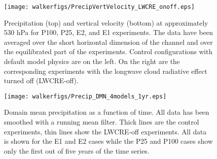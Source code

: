 \documentclass[draft]{agujournal2019}
\begin{document}

\begin{figure}
  \centering
      \texttt{[image: walkerfigs/PrecipVertVelocity\_LWCRE\_onoff.eps]}
  \caption{Precipitation (top) and vertical velocity (bottom) at approximately 530 hPa for P100, P25, E2, and E1 experiments.  
  The data have been averaged over the short horizontal dimension of the channel and over the 
  equilibrated part of the experiments.  Control configurations with default model physics are on the 
  left.  On the right are the corresponding experiments with the longwave cloud radiative effect turned
  off (LWCRE-off).}
  \label{fig:precip_vertvel}
\end{figure}
%
%
%

\begin{figure}
  \centering
      \texttt{[image: walkerfigs/Precip\_DMN\_4models\_1yr.eps]}
  \caption{Domain mean precipitation as a function of time.  All data has been smoothed with a running mean filter.  
  Thick lines are the control experiments, thin lines show the LWCRE-off experiments.  All data is shown for the E1 and E2 cases
  while the P25 and P100 cases show only the first out of five years of the time series.}
    \label{fig:precip_dom_mn}
\end{figure}
\end{document}
